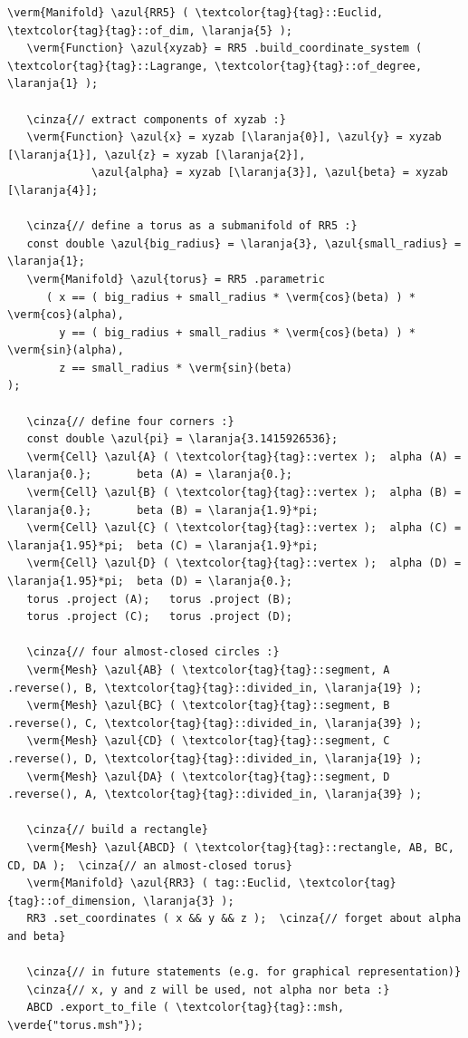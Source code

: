 \begin{Verbatim}[commandchars=\\\{\},formatcom=\small\tt,frame=single,
   label=parag-\ref{\numb section 2.\numb parag 20}.cpp,rulecolor=\color{coment},
   baselinestretch=0.94,framesep=2mm]
   \verm{Manifold} \azul{RR5} ( \textcolor{tag}{tag}::Euclid, \textcolor{tag}{tag}::of_dim, \laranja{5} );
   \verm{Function} \azul{xyzab} = RR5 .build_coordinate_system ( \textcolor{tag}{tag}::Lagrange, \textcolor{tag}{tag}::of_degree, \laranja{1} );

   \cinza{// extract components of xyzab :}
   \verm{Function} \azul{x} = xyzab [\laranja{0}], \azul{y} = xyzab [\laranja{1}], \azul{z} = xyzab [\laranja{2}],
             \azul{alpha} = xyzab [\laranja{3}], \azul{beta} = xyzab [\laranja{4}];

   \cinza{// define a torus as a submanifold of RR5 :}
   const double \azul{big_radius} = \laranja{3}, \azul{small_radius} = \laranja{1};
   \verm{Manifold} \azul{torus} = RR5 .parametric
      ( x == ( big_radius + small_radius * \verm{cos}(beta) ) * \verm{cos}(alpha),
        y == ( big_radius + small_radius * \verm{cos}(beta) ) * \verm{sin}(alpha),
        z == small_radius * \verm{sin}(beta)                               );
        
   \cinza{// define four corners :}
   const double \azul{pi} = \laranja{3.1415926536};
   \verm{Cell} \azul{A} ( \textcolor{tag}{tag}::vertex );  alpha (A) = \laranja{0.};       beta (A) = \laranja{0.};
   \verm{Cell} \azul{B} ( \textcolor{tag}{tag}::vertex );  alpha (B) = \laranja{0.};       beta (B) = \laranja{1.9}*pi;
   \verm{Cell} \azul{C} ( \textcolor{tag}{tag}::vertex );  alpha (C) = \laranja{1.95}*pi;  beta (C) = \laranja{1.9}*pi;
   \verm{Cell} \azul{D} ( \textcolor{tag}{tag}::vertex );  alpha (D) = \laranja{1.95}*pi;  beta (D) = \laranja{0.};
   torus .project (A);   torus .project (B);
   torus .project (C);   torus .project (D);

   \cinza{// four almost-closed circles :}
   \verm{Mesh} \azul{AB} ( \textcolor{tag}{tag}::segment, A .reverse(), B, \textcolor{tag}{tag}::divided_in, \laranja{19} );
   \verm{Mesh} \azul{BC} ( \textcolor{tag}{tag}::segment, B .reverse(), C, \textcolor{tag}{tag}::divided_in, \laranja{39} );
   \verm{Mesh} \azul{CD} ( \textcolor{tag}{tag}::segment, C .reverse(), D, \textcolor{tag}{tag}::divided_in, \laranja{19} );
   \verm{Mesh} \azul{DA} ( \textcolor{tag}{tag}::segment, D .reverse(), A, \textcolor{tag}{tag}::divided_in, \laranja{39} );

   \cinza{// build a rectangle}
   \verm{Mesh} \azul{ABCD} ( \textcolor{tag}{tag}::rectangle, AB, BC, CD, DA );  \cinza{// an almost-closed torus}
   \verm{Manifold} \azul{RR3} ( tag::Euclid, \textcolor{tag}{tag}::of_dimension, \laranja{3} );
   RR3 .set_coordinates ( x && y && z );  \cinza{// forget about alpha and beta}

   \cinza{// in future statements (e.g. for graphical representation)}
   \cinza{// x, y and z will be used, not alpha nor beta :}
   ABCD .export_to_file ( \textcolor{tag}{tag}::msh, \verde{"torus.msh"});
\end{Verbatim}

